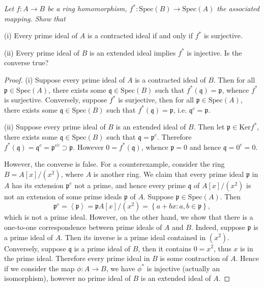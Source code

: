 \begin{problem}\em
Let $f:A\to B$ be a ring homomorphism, $f^*:\mathrm{Spec}(B)\to\mathrm{Spec}(A)$ the associated mapping. Show that \par
(i) Every prime ideal of $A$ is a contracted ideal if and only if $f^*$ is surjective.\par
(ii) Every prime ideal of $B$ is an extended ideal implies $f^*$ is injective. Is the converse true?
\end{problem}
\begin{proof}
(i) Suppose every prime ideal of $A$ is a contracted ideal of $B$. Then for all $\mathfrak{p}\in\mathrm{Spec}(A)$, there exists some $\mathfrak{q}\in\mathrm{Spec}(B)$ such that $f^*(\mathfrak{q})=\mathfrak{p}$, whence $f^*$ is surjective. Conversely, suppose $f^*$ is surjective, then for all $\mathfrak{p}\in\mathrm{Spec}(A)$, there exists some $\mathfrak{q}\in\mathrm{Spec}(B)$ such that $f^*(\mathfrak{q})=\mathfrak{p}$, i.e. $\mathfrak{q}^c=\mathfrak{p}$.\par
(ii) Suppose every prime ideal of $B$ is an extended ideal of $B$. Then let $\mathfrak{p}\in\mathrm{Ker}f^*$, there exists some $\mathfrak{q}\in\mathrm{Spec}(B)$ such that $\mathfrak{q}=\mathfrak{p}^e$. Therefore $f^*(\mathfrak{q})=\mathfrak{q}^c=\mathfrak{p}^{ec}\supset\mathfrak{p}$. However $0=f^*(\mathfrak{q})$, whence $\mathfrak{p}=0$ and hence $\mathfrak{q}=0^e=0$.\par
However, the converse is false. For a counterexample, consider the ring $B=A[x]/(x^2)$, where $A$ is another ring. We claim that every prime ideal $\mathfrak{p}$ in $A$ has its extension $\mathfrak{p}^e$ not a prime, and hence every prime $\mathfrak{q}$ of $A[x]/(x^2)$ is not an extension of some prime ideals $\mathfrak{p}$ of $A$. Suppose $\mathfrak{p}\in\mathrm{Spec}(A)$. Then 
$$
\mathfrak{p} ^e=\left< \mathfrak{p} \right> =\mathfrak{p} A\left[ x \right] /\left( x^2 \right) =\left\{ a+bx:a,b\in \mathfrak{p} \right\} ,
$$
which is not a prime ideal. However, on the other hand, we show that there is a one-to-one correspondence between prime ideals of $A$ and $B$. Indeed, suppose $\mathfrak{p}$ is a prime ideal of $A$. Then its inverse is a prime ideal contained in $(x^2)$. Conversely, suppose $\mathfrak{q}$ is a prime ideal of $B$, then it contains $0=x^2$, thus $x$ is in the prime ideal. Therefore every prime ideal in $B$ is some contraction of $A$. Hence if we consider the map $\phi:A\to B$, we have $\phi^*$ is injective (actually an isomorphism), however no prime ideal of $B$ is an extended ideal of $A$.
\end{proof}
